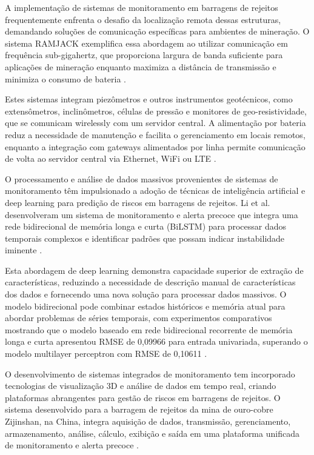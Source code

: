 A implementação de sistemas de monitoramento em barragens de rejeitos frequentemente enfrenta o desafio da localização remota dessas estruturas, demandando soluções de comunicação específicas para ambientes de mineração. O sistema RAMJACK exemplifica essa abordagem ao utilizar comunicação em frequência sub-gigahertz, que proporciona largura de banda suficiente para aplicações de mineração enquanto maximiza a distância de transmissão e minimiza o consumo de bateria \cite{ramjack2022tailings}.

Estes sistemas integram piezômetros e outros instrumentos geotécnicos, como extensômetros, inclinômetros, células de pressão e monitores de geo-resistividade, que se comunicam wirelessly com um servidor central. A alimentação por bateria reduz a necessidade de manutenção e facilita o gerenciamento em locais remotos, enquanto a integração com gateways alimentados por linha permite comunicação de volta ao servidor central via Ethernet, WiFi ou LTE \cite{ramjack2022tailings}.

O processamento e análise de dados massivos provenientes de sistemas de monitoramento têm impulsionado a adoção de técnicas de inteligência artificial e deep learning para predição de riscos em barragens de rejeitos. Li et al. desenvolveram um sistema de monitoramento e alerta precoce que integra uma rede bidirecional de memória longa e curta (BiLSTM) para processar dados temporais complexos e identificar padrões que possam indicar instabilidade iminente \cite{jing2022monitoring}.

Esta abordagem de deep learning demonstra capacidade superior de extração de características, reduzindo a necessidade de descrição manual de características dos dados e fornecendo uma nova solução para processar dados massivos. O modelo bidirecional pode combinar estados históricos e memória atual para abordar problemas de séries temporais, com experimentos comparativos mostrando que o modelo baseado em rede bidirecional recorrente de memória longa e curta apresentou RMSE de 0,09966 para entrada univariada, superando o modelo multilayer perceptron com RMSE de 0,10611 \cite{jing2022monitoring}.

O desenvolvimento de sistemas integrados de monitoramento tem incorporado tecnologias de visualização 3D e análise de dados em tempo real, criando plataformas abrangentes para gestão de riscos em barragens de rejeitos. O sistema desenvolvido para a barragem de rejeitos da mina de ouro-cobre Zijinshan, na China, integra aquisição de dados, transmissão, gerenciamento, armazenamento, análise, cálculo, exibição e saída em uma plataforma unificada de monitoramento e alerta precoce \cite{frontiers2022visualization}.

